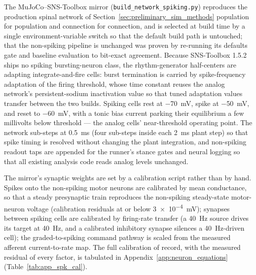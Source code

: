 The MuJoCo--SNS-Toolbox mirror (\texttt{build\_network\_spiking.py}) reproduces the production spinal network of Section~\ref{sec:preliminary_sim_methods} population for population and connection for connection, and is selected at build time by a single environment-variable switch so that the default build path is untouched; that the non-spiking pipeline is unchanged was proven by re-running its defaults gate and baseline evaluation to bit-exact agreement. Because SNS-Toolbox 1.5.2 ships no spiking bursting-neuron class, the rhythm-generator half-centers are adapting integrate-and-fire cells: burst termination is carried by spike-frequency adaptation of the firing threshold, whose time constant reuses the analog network's persistent-sodium inactivation value so that tuned adaptation values transfer between the two builds. Spiking cells rest at \qty{-70}{\mV}, spike at \qty{-50}{\mV}, and reset to \qty{-60}{\mV}, with a tonic bias current parking their equilibrium a few millivolts below threshold --- the analog cells' near-threshold operating point. The network sub-steps at \qty{0.5}{\ms} (four sub-steps inside each \qty{2}{\ms} plant step) so that spike timing is resolved without changing the plant integration, and non-spiking readout taps are appended for the runner's stance gates and neural logging so that all existing analysis code reads analog levels unchanged.

The mirror's synaptic weights are set by a calibration script rather than by hand. Spikes onto the non-spiking motor neurons are calibrated by mean conductance, so that a steady presynaptic train reproduces the non-spiking steady-state motor-neuron voltage (calibration residuals at or below \qty{3e-4}{\mV}); synapses between spiking cells are calibrated by firing-rate transfer (a \qty{40}{\hertz} source drives its target at \qty{40}{\hertz}, and a calibrated inhibitory synapse silences a \qty{40}{\hertz}-driven cell); the graded-to-spiking command pathway is scaled from the measured afferent current-to-rate map. The full calibration of record, with the measured residual of every factor, is tabulated in Appendix~\ref{app:neuron_equations} (Table~\ref{tab:app_spk_cal}).


